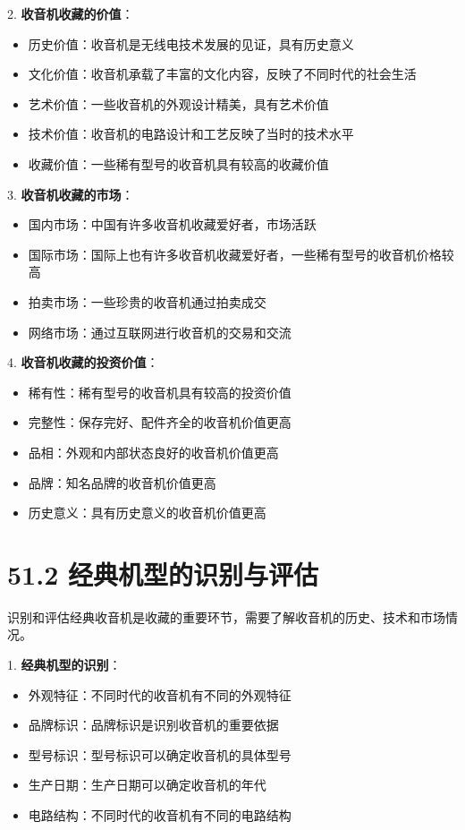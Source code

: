 \documentclass[12pt,UTF8]{ctexbook}
\begin{document}
2. \textbf{收音机收藏的价值}：
   \begin{itemize}[leftmargin=3.5em]
   \item 历史价值：收音机是无线电技术发展的见证，具有历史意义
   \item 文化价值：收音机承载了丰富的文化内容，反映了不同时代的社会生活
   \item 艺术价值：一些收音机的外观设计精美，具有艺术价值
   \item 技术价值：收音机的电路设计和工艺反映了当时的技术水平
   \item 收藏价值：一些稀有型号的收音机具有较高的收藏价值
   \end{itemize}

3. \textbf{收音机收藏的市场}：
   \begin{itemize}[leftmargin=3.5em]
   \item 国内市场：中国有许多收音机收藏爱好者，市场活跃
   \item 国际市场：国际上也有许多收音机收藏爱好者，一些稀有型号的收音机价格较高
   \item 拍卖市场：一些珍贵的收音机通过拍卖成交
   \item 网络市场：通过互联网进行收音机的交易和交流
   \end{itemize}

4. \textbf{收音机收藏的投资价值}：
   \begin{itemize}[leftmargin=3.5em]
   \item 稀有性：稀有型号的收音机具有较高的投资价值
   \item 完整性：保存完好、配件齐全的收音机价值更高
   \item 品相：外观和内部状态良好的收音机价值更高
   \item 品牌：知名品牌的收音机价值更高
   \item 历史意义：具有历史意义的收音机价值更高
   \end{itemize}

\section*{51.2 经典机型的识别与评估}

识别和评估经典收音机是收藏的重要环节，需要了解收音机的历史、技术和市场情况。

1. \textbf{经典机型的识别}：
   \begin{itemize}[leftmargin=3.5em]
   \item 外观特征：不同时代的收音机有不同的外观特征
   \item 品牌标识：品牌标识是识别收音机的重要依据
   \item 型号标识：型号标识可以确定收音机的具体型号
   \item 生产日期：生产日期可以确定收音机的年代
   \item 电路结构：不同时代的收音机有不同的电路结构
   \end{itemize}
\end{document}
